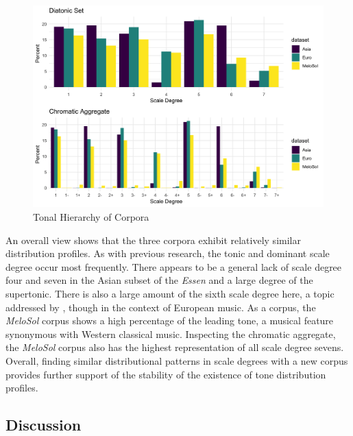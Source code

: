 \documentclass[12pt,]{book}
\begin{document}
\begin{figure}

{\centering \includegraphics[width=1\linewidth]{img/krumpanel} 

}

\caption{Tonal Hierarchy of Corpora}\label{fig:krum}
\end{figure}

An overall view shows that the three corpora exhibit relatively similar distribution profiles.
As with previous research, the tonic and dominant scale degree occur most frequently.
There appears to be a general lack of scale degree four and seven in the Asian subset of the \emph{Essen} and a large degree of the supertonic.
There is also a large amount of the sixth scale degree here, a topic addressed by \citet{brinkmanLeadingSixthScale2018}, though in the context of European music.
As a corpus, the \emph{MeloSol} corpus shows a high percentage of the leading tone, a musical feature synonymous with Western classical music.
Inspecting the chromatic aggregate, the \emph{MeloSol} corpus also has the highest representation of all scale degree sevens.
Overall, finding similar distributional patterns in scale degrees with a new corpus provides further support of the stability of the existence of tone distribution profiles.

\hypertarget{discussion-1}{%
\subsection{Discussion}\label{discussion-1}}
\end{document}
